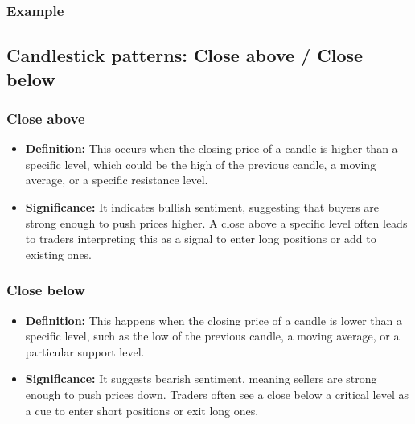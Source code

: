 \documentclass{report}
\begin{document}
    \bigbreak \noindent 
    \subsubsection{Example}
    \bigbreak \noindent 



    \pagebreak 
     \subsection{Candlestick patterns: Close above / Close below}
     \bigbreak \noindent 
     \bigbreak \noindent 
     \bigbreak \noindent 
     \subsubsection{Close above}
     \bigbreak \noindent 
     \begin{itemize}
         \item \textbf{Definition:} This occurs when the closing price of a candle is higher than a specific level, which could be the high of the previous candle, a moving average, or a specific resistance level.
         \item \textbf{Significance:} It indicates bullish sentiment, suggesting that buyers are strong enough to push prices higher. A close above a specific level often leads to traders interpreting this as a signal to enter long positions or add to existing ones.
     \end{itemize}
     \bigbreak \noindent 
     \subsubsection{Close below}
     \bigbreak \noindent 
     \begin{itemize}
         \item \textbf{Definition:} This happens when the closing price of a candle is lower than a specific level, such as the low of the previous candle, a moving average, or a particular support level.
         \item \textbf{Significance:} It suggests bearish sentiment, meaning sellers are strong enough to push prices down. Traders often see a close below a critical level as a cue to enter short positions or exit long ones.
     \end{itemize}
     
\end{document}
